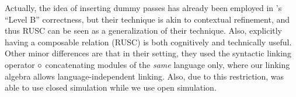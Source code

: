 Actually, the idea of inserting dummy passes has already been employed in \scc{}'s ``Level B'' correctness, but their technique is akin to contextual refinement, and thus RUSC can be seen as a generalization of their technique.
Also, explicitly having a composable relation (RUSC) is both cognitively and technically useful.
Other minor differences are that in their setting, they used the syntactic linking operator $\circ$ concatenating modules of the \emph{same} language only, where our linking algebra allows language-independent linking.
Also, due to this restriction, \scc{} was able to use closed simulation while we use open simulation.




